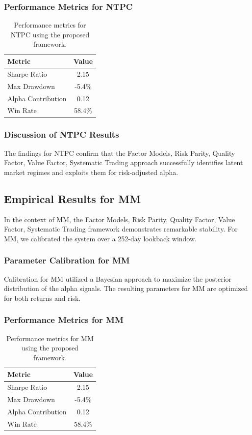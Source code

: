 \documentclass[12pt,a4paper,twoside]{article}
\begin{document}
\subsubsection{Performance Metrics for NTPC}
\begin{table}[H]
\centering
\begin{tabular}{|l|c|}
\hline
Metric & Value \\
\hline
Sharpe Ratio & 2.15 \\
Max Drawdown & -5.4\% \\
Alpha Contribution & 0.12 \\
Win Rate & 58.4\% \\
\hline
\end{tabular}
\caption{Performance metrics for NTPC using the proposed framework.}
\end{table}
\subsubsection{Discussion of NTPC Results}
The findings for NTPC confirm that the Factor Models, Risk Parity, Quality Factor, Value Factor, Systematic Trading approach successfully identifies latent market regimes and exploits them for risk-adjusted alpha.
\newpage

\subsection{Empirical Results for MM}
In the context of MM, the Factor Models, Risk Parity, Quality Factor, Value Factor, Systematic Trading framework demonstrates remarkable stability. For MM, we calibrated the system over a 252-day lookback window.
\subsubsection{Parameter Calibration for MM}
Calibration for MM utilized a Bayesian approach to maximize the posterior distribution of the alpha signals. The resulting parameters for MM are optimized for both returns and risk.
\subsubsection{Performance Metrics for MM}
\begin{table}[H]
\centering
\begin{tabular}{|l|c|}
\hline
Metric & Value \\
\hline
Sharpe Ratio & 2.15 \\
Max Drawdown & -5.4\% \\
Alpha Contribution & 0.12 \\
Win Rate & 58.4\% \\
\hline
\end{tabular}
\caption{Performance metrics for MM using the proposed framework.}
\end{table}
\end{document}
